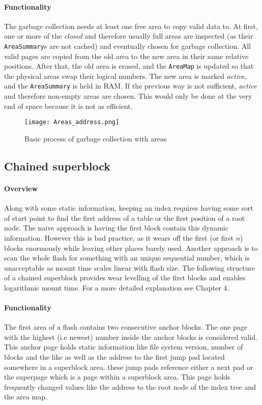 \paragraph{Functionality}
The garbage collection needs at least one free area to copy valid data to. At first, one or more of the \textit{closed} and therefore usually full areas are inspected (as their \texttt{AreaSummary}s are not cached) and eventually chosen for garbage collection. All valid pages are copied from the old area to the new area in their same relative positions. After that, the old area is erased, and the \texttt{AreaMap} is updated so that the physical areas swap their logical numbers. The new area is marked \textit{active}, and the \texttt{AreaSummary} is held in RAM. If the previous way is not sufficient, \textit{active} and therefore non-empty areas are chosen. This would only be done at the very end of space because it is not as efficient.

\begin{figure}[ht]
  \centering\texttt{[image: Areas\_address.png]}
  \caption{Basic process of garbage collection with areas}
  \label{fig:area_address}
\end{figure}

\subsection{Chained superblock}
\label{sub:chainedSB}
\paragraph{Overview}
Along with some static information, keeping an index requires having some sort of start point to find the first address of a table or the first position of a root node. The naive approach is having the first block contain this dynamic information. However this is bad practice, as it wears off the first (or first $n$) blocks enormously while leaving other places barely used. Another approach is to scan the whole flash for something with an unique sequential number, which is unacceptable as mount time scales linear with flash size.
The following structure of a chained superblock provides wear levelling of the first blocks and enables logarithmic mount time.
For a more detailed explanation see  Chapter 4.

\paragraph{Functionality}
The first area of a flash contains two consecutive anchor blocks. The one page with the highest (i.e newest) number inside the anchor blocks is considered valid. This anchor page holds static information like file system version, number of blocks and the like as well as the address to the first jump pad located somewhere in a superblock area. these jump pads reference either a next pad or the superpage which is a page within a superblock area. This page holds frequently changed values like the address to the root node of the index tree and the area map.\\

